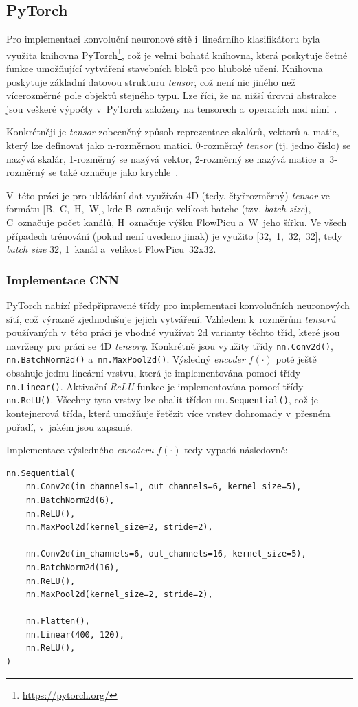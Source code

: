 \subsection{PyTorch}
Pro implementaci konvoluční neuronové sítě i~lineárního klasifikátoru byla využita knihovna PyTorch\footnote{\url{https://pytorch.org/}}, což je velmi bohatá knihovna, která poskytuje četné funkce umožňující vytváření stavebních bloků pro hluboké učení. Knihovna poskytuje základní datovou strukturu \textit{tensor}, což není nic jiného než vícerozměrné pole objektů stejného typu. Lze říci, že na nižší úrovni abstrakce jsou veškeré výpočty v~PyTorch založeny na tensorech a~operacích nad nimi~\cite{pytorch}.

Konkrétněji je \textit{tensor} zobecněný způsob reprezentace skalárů, vektorů a~matic, který lze definovat jako n-rozměrnou matici. 0-rozměrný \textit{tensor} (tj. jedno číslo) se nazývá skalár, 1-rozměrný se nazývá vektor, 2-rozměrný se nazývá matice a~3-rozměrný se také označuje jako krychle~\cite{pytorch}. 

V~této práci je pro ukládání dat využíván 4D (tedy. čtyřrozměrný) \textit{tensor} ve formátu [B,~C,~H,~W], kde B~označuje velikost batche (tzv. \textit{batch size}), C~označuje počet kanálů, H~označuje výšku FlowPicu a~W~jeho šířku. Ve všech případech trénování (pokud není uvedeno jinak) je využito [32,~1,~32,~32], tedy \textit{batch size} 32, 1~kanál a~velikost FlowPicu~32x32.

\subsubsection*{Implementace CNN}
PyTorch nabízí předpřipravené třídy pro implementaci konvolučních neuronových sítí, což výrazně zjednodušuje jejich vytváření. Vzhledem k~rozměrům \textit{tensorů} používaných v~této práci je vhodné využívat 2d varianty těchto tříd, které jsou navrženy pro práci se 4D \textit{tensory}. Konkrétně jsou využity třídy \texttt{nn.Conv2d()}, \texttt{nn.BatchNorm2d()} a~\texttt{nn.MaxPool2d()}. Výsledný \textit{encoder} $f(\cdot)$ poté ještě obsahuje jednu lineární vrstvu, která je implementována pomocí třídy \texttt{nn.Linear()}. Aktivační \textit{ReLU} funkce je implementována pomocí třídy \texttt{nn.ReLU()}. Všechny tyto vrstvy lze obalit třídou \texttt{nn.Sequential()}, což je kontejnerová třída, která umožňuje řetězit více vrstev dohromady v~přesném pořadí, v~jakém jsou zapsané. 

Implementace výsledného \textit{encoderu} $f(\cdot)$ tedy vypadá následovně:
\begin{lstlisting}[caption={Implementace \textit{encoderu} $f(\cdot)$.}]
nn.Sequential(
    nn.Conv2d(in_channels=1, out_channels=6, kernel_size=5),
    nn.BatchNorm2d(6),
    nn.ReLU(),
    nn.MaxPool2d(kernel_size=2, stride=2),
        
    nn.Conv2d(in_channels=6, out_channels=16, kernel_size=5),
    nn.BatchNorm2d(16),
    nn.ReLU(),
    nn.MaxPool2d(kernel_size=2, stride=2),
        
    nn.Flatten(),
    nn.Linear(400, 120),
    nn.ReLU(),
)
\end{lstlisting}

